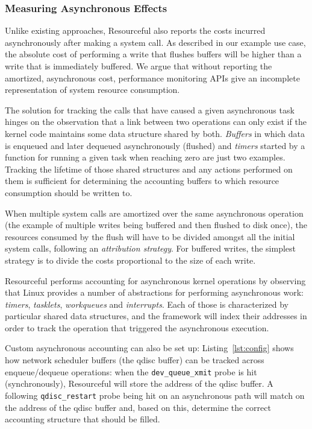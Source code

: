 \documentclass[letterpaper,twocolumn,10pt]{article}
\newcommand{\pname}{Resourceful}
\begin{document}
\subsubsection{Measuring Asynchronous Effects}
Unlike existing approaches, \pname{} also reports the costs incurred
asynchronously after making a system call. As described in our example
use case, the absolute cost of performing a write that flushes buffers will be
higher than a write that is immediately buffered. We argue that without
reporting the amortized, asynchronous cost, performance monitoring APIs give an
incomplete representation of system resource consumption.

The solution for tracking the calls that have caused a given asynchronous task
hinges on the observation that a link between two operations can only exist if
the kernel code maintains some data structure shared by both. \textit{Buffers}
in which data is enqueued and later dequeued asynchronously (flushed) and
\textit{timers} started by a function for running a given task when reaching
zero are just two examples. Tracking the lifetime of those shared structures and
any actions performed on them is sufficient for determining the accounting
buffers to which resource consumption should be written to. 

When multiple system calls are amortized over the same asynchronous operation
(the example of multiple writes being buffered and then flushed to disk once),
the resources consumed by the flush will have to be divided amongst all the
initial system calls, following an \textit{attribution strategy}. For buffered writes,
the simplest strategy is to divide the costs proportional to the size of each
write.

\pname{ }performs accounting for asynchronous kernel operations by observing
that Linux provides a number of abstractions for performing asynchronous work:
\emph{timers}, \emph{tasklets}, \emph{workqueues} and \emph{interrupts}. Each of
those is characterized by particular shared data structures, and the framework
will index their addresses in order to track the operation that triggered the
asynchronous execution.

Custom asynchronous accounting can also be set up: Listing~\ref{lst:config}
shows how network scheduler buffers (the qdisc buffer) can be tracked across
enqueue/dequeue operations: when the \texttt{dev\_queue\_xmit} probe is hit
(synchronously), \pname{ }will store the address of the qdisc buffer. A
following \texttt{qdisc\_restart} probe being hit on an asynchronous path will
match on the address of the qdisc buffer and, based on this, determine the
correct accounting structure that should be filled.
\end{document}
